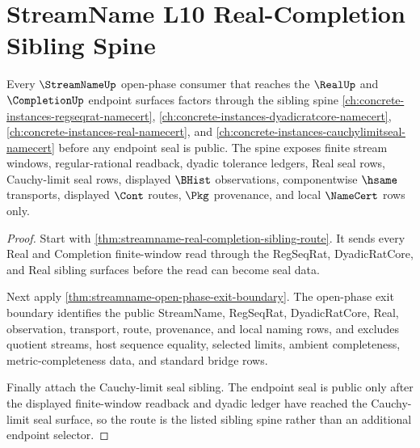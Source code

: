\section{StreamName L10 Real-Completion Sibling Spine}
\label{sec:streamname-l10-real-completion-sibling-spine}

\begin{theorem}
\label{thm:streamname-l10-real-completion-sibling-spine}
Every $\StreamNameUp$ open-phase consumer that reaches the $\RealUp$ and $\CompletionUp$ endpoint surfaces factors through the sibling spine
\autoref{ch:concrete-instances-regseqrat-namecert},
\autoref{ch:concrete-instances-dyadicratcore-namecert},
\autoref{ch:concrete-instances-real-namecert},
and \autoref{ch:concrete-instances-cauchylimitseal-namecert}
before any endpoint seal is public. The spine exposes finite stream windows, regular-rational readback, dyadic tolerance ledgers, Real seal rows, Cauchy-limit seal rows, displayed $\BHist$ observations, componentwise $\hsame$ transports, displayed $\Cont$ routes, $\Pkg$ provenance, and local $\NameCert$ rows only.
\end{theorem}
\begin{proof}
Start with \autoref{thm:streamname-real-completion-sibling-route}. It sends every Real and Completion finite-window read through the RegSeqRat, DyadicRatCore, and Real sibling surfaces before the read can become seal data.

Next apply \autoref{thm:streamname-open-phase-exit-boundary}. The open-phase exit boundary identifies the public StreamName, RegSeqRat, DyadicRatCore, Real, observation, transport, route, provenance, and local naming rows, and excludes quotient streams, host sequence equality, selected limits, ambient completeness, metric-completeness data, and standard bridge rows.

Finally attach the Cauchy-limit seal sibling. The endpoint seal is public only after the displayed finite-window readback and dyadic ledger have reached the Cauchy-limit seal surface, so the route is the listed sibling spine rather than an additional endpoint selector.
\end{proof}
